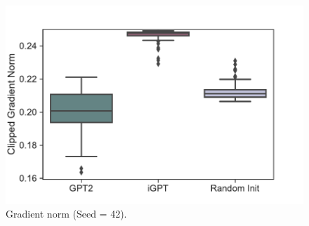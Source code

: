 \documentclass{article}
\begin{document}
\begin{figure}[H]
\begin{minipage}[b]{0.32\linewidth}
    \end{minipage}
    \begin{minipage}[b]{0.32\linewidth}
        \includegraphics[width=\linewidth]{figs/gradnorms_1_gpt2_igpt_dt_walker2d_medium_42.pdf}
    \end{minipage}
    \caption{Gradient norm (Seed = 42).}
\end{figure}
\end{document}

